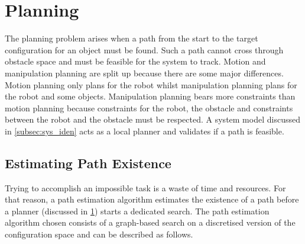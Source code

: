 \section{Planning}%
\label{sec:planning}
The planning problem arises when a path from the start to the target configuration for an object must be found. Such a path cannot cross through obstacle space and must be feasible for the system to track. Motion and manipulation planning are split up because there are some major differences. Motion planning only plans for the robot whilst manipulation planning plans for the robot and some objects. Manipulation planning bears more constraints than motion planning because constraints for the robot, the obstacle and constraints between the robot and the obstacle must be respected. A system model discussed in \cref{subsec:sys_iden} acts as a local planner and validates if a path is feasible. 


\subsection{Estimating Path Existence}%
\label{subsec:path_estimation}
Trying to accomplish an impossible task is a waste of time and resources. For that reason, a path estimation algorithm estimates the existence of a path before a planner (discussed in \cref{sec:planning}) starts a dedicated search. The path estimation algorithm chosen consists of a graph-based search on a discretised version of the configuration space and can be described as follows.\bs

\bs


